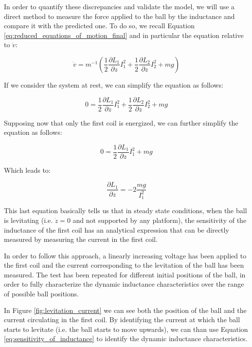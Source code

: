 In order to quantify these discrepancies and validate the model, we will use a direct method to measure the force applied to the ball by the inductance and compare it with the predicted one.
To do so, we recall Equation \ref{eq:reduced_equations_of_motion_final} and in particular the equation relative to $\dot{v}$:

\begin{equation}
    \dot{v} = m^{-1} \left(\frac{1}{2} \frac{\partial L_1}{\partial z} I_1^2 + \frac{1}{2} \frac{\partial L_2}{\partial z} I_2^2 + m g  \right)
\end{equation}

If we consider the system at rest, we can simplify the equation as follows:

\begin{equation}
    0 = \frac{1}{2} \frac{\partial L_1}{\partial z} I_1^2 + \frac{1}{2} \frac{\partial L_2}{\partial z} I_2^2 + m g
\end{equation}

Supposing now that only the first coil is energized, we can further simplify the equation as follows:

\begin{equation}
    0 = \frac{1}{2} \frac{\partial L_1}{\partial z} I_1^2 + m g
\end{equation}

Which leads to:

\begin{equation}
    \frac{\partial L_1}{\partial z} = -2 \frac{m g}{I_1^2}
    \label{eq:sensitivity_of_inductance}
\end{equation}

This last equation basically tells us that in steady state conditions, when the ball is levitating (i.e. $\dot{z} = 0$ and not supported by any platform), the sensitivity of the inductance of the first coil has an analytical expression that can be directly measured by measuring the current in the first coil.

In order to follow this approach, a linearly increasing voltage has been applied to the first coil and the current corresponding to the levitation of the ball has been measured.
The test has been repeated for different initial positions of the ball, in order to fully characterize the dynamic inductance characteristics over the range of possible ball positions.

In Figure \ref{fig:levitation_current} we can see both the position of the ball and the current circulating in the first coil.
By identifying the current at which the ball starts to levitate (i.e. the ball starts to move upwards), we can than use Equation \ref{eq:sensitivity_of_inductance} to identify the dynamic inductance characteristics.

